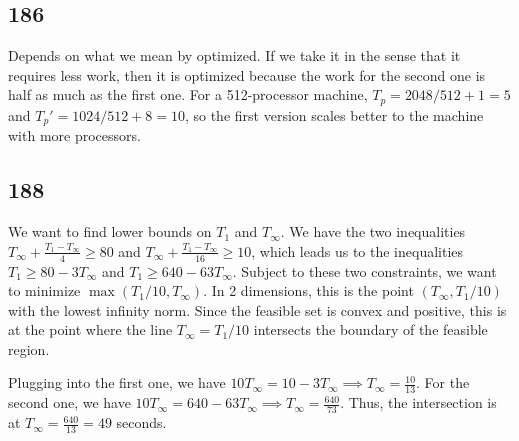 \documentclass{article}
\begin{document}
\subsection*{186}
Depends on what we mean by optimized. If we take it in the sense that it requires less work, then it is optimized because the work for the second one is half as much as the first one. For a 512-processor machine, $T_p=2048/512+1=5$ and $T_p'=1024/512+8=10$, so the first version scales better to the machine with more processors.
\subsection*{188}
We want to find lower bounds on $T_1$ and $T_\infty$. We have the two inequalities $T_\infty+\frac{T_1-T_\infty}{4}\geq80$ and $T_\infty+\frac{T_1-T_\infty}{16}\geq10$, which leads us to the inequalities $T_1\geq80-3T_\infty$ and $T_1\geq640-63T_\infty$. Subject to these two constraints, we want to minimize $\max(T_1/10, T_\infty)$. In 2 dimensions, this is the point $(T_\infty, T_1/10)$ with the lowest infinity norm. Since the feasible set is convex and positive, this is at the point where the line $T_\infty=T_1/10$ intersects the boundary of the feasible region. 

Plugging into the first one, we have $10T_\infty=10-3T_\infty\implies T_\infty=\frac{10}{13}$. For the second one, we have $10T_\infty=640-63T_\infty\implies T_\infty=\frac{640}{73}$. Thus, the intersection is at $T_\infty=\frac{640}{13}=49$ seconds.
\end{document}

